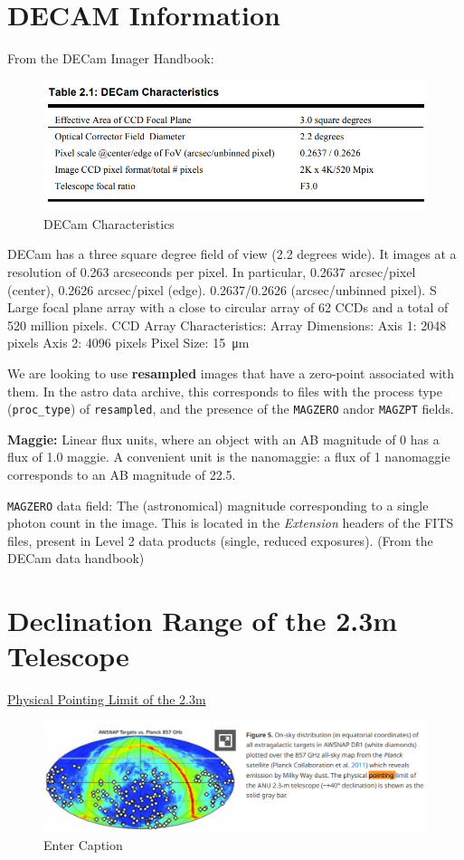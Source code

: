 \documentclass{article}
\begin{document}
\section{DECAM Information}
From the DECam Imager Handbook: \newline
\begin{figure}[hbt!]
    \centering
    \includegraphics[width=0.5\linewidth]{Decam Characteristics.png}
    \caption{DECam Characteristics}
    \label{fig:enter-label}
\end{figure}
DECam has a three square degree field of view (2.2 degrees wide). It images at a resolution of 0.263 arcseconds per pixel. In particular, 0.2637 arcsec/pixel (center), 0.2626 arcsec/pixel (edge).  0.2637/0.2626 (arcsec/unbinned pixel). S Large focal plane array with a close to circular array of 62 CCDs and a total of 520 million pixels. 
\newline 
CCD Array Characteristics:
\newline
Array Dimensions: 
    Axis 1: 2048 pixels
    Axis 2: 4096 pixels
\newline
Pixel Size: \SI{15}{\micro\metre}


We are looking to use \textbf{resampled} images that have a zero-point associated with them. In the astro data archive, this corresponds to files with the process type (\texttt{proc\_type}) of \texttt{resampled}, and the presence of the \texttt{MAGZERO} and\/or \texttt{MAGZPT} fields.

\textbf{Maggie:} Linear flux units, where an object with an AB magnitude of 0 has a flux of 1.0 maggie. A convenient unit is the nanomaggie: a flux of 1 nanomaggie corresponds to an AB magnitude of 22.5.

\texttt{MAGZERO} data field: The (astronomical) magnitude corresponding to a single photon count in the image. This is located in the \textit{Extension} headers of the FITS files, present in Level 2 data products (single, reduced exposures). (From the DECam data handbook)\\

\section{Declination Range of the 2.3m Telescope}
\href{https://www.cambridge.org/core/journals/publications-of-the-astronomical-society-of-australia/article/anu-wifes-supernova-programme-awsnap/1DF292200162D34D6E5A268CE18C3653} {Physical Pointing Limit of the 2.3m}
\begin{figure}[hbt!]
    \centering
    \includegraphics[width=0.5\linewidth]{image.png}
    \caption{Enter Caption}
    \label{fig:enter-label}
\end{figure}
\end{document}
